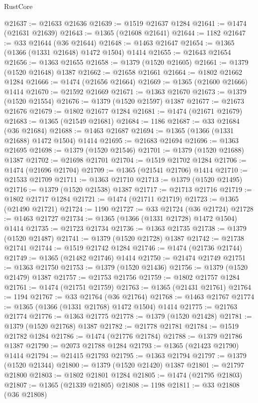 \begin{lexlean}{RustCore}
\begin{coremodule}
@21637 := @21633 @21636
@21639 := @1519 @21637 @1284
@21641 := @1474 (@21631 @21639)
@21643 := @1365 (@21608 @21641)
@21644 := 1182
@21647 := @33 @21644 (@36 @21644)
@21648 := @1463 @21647
@21654 := @1365 (@1366 (@1331 @21648) @1472 @1504) @1414
@21655 := @21643 @21654
@21656 := @1363 @21655
@21658 := @1379 (@1520 @21605)
@21661 := @1379 (@1520 @21648) @1387
@21662 := @21658 @21661
@21664 := @1802 @21662 @1284
@21666 := @1474 (@21656 @21664)
@21669 := @1365 (@21600 @21666) @1414
@21670 := @21592 @21669
@21671 := @1363 @21670
@21673 := @1379 (@1520 @21554)
@21676 := @1379 (@1520 @21597) @1387
@21677 := @21673 @21676
@21679 := @1802 @21677 @1284
@21681 := @1474 (@21671 @21679)
@21683 := @1365 (@21549 @21681)
@21684 := 1186
@21687 := @33 @21684 (@36 @21684)
@21688 := @1463 @21687
@21694 := @1365 (@1366 (@1331 @21688) @1472 @1504) @1414
@21695 := @21683 @21694
@21696 := @1363 @21695
@21698 := @1379 (@1520 @21546)
@21701 := @1379 (@1520 @21688) @1387
@21702 := @21698 @21701
@21704 := @1519 @21702 @1284
@21706 := @1474 (@21696 @21704)
@21709 := @1365 (@21541 @21706) @1414
@21710 := @21533 @21709
@21711 := @1363 @21710
@21713 := @1379 (@1520 @21495)
@21716 := @1379 (@1520 @21538) @1387
@21717 := @21713 @21716
@21719 := @1802 @21717 @1284
@21721 := @1474 (@21711 @21719)
@21723 := @1365 (@21490 @21721)
@21724 := 1190
@21727 := @33 @21724 (@36 @21724)
@21728 := @1463 @21727
@21734 := @1365 (@1366 (@1331 @21728) @1472 @1504) @1414
@21735 := @21723 @21734
@21736 := @1363 @21735
@21738 := @1379 (@1520 @21487)
@21741 := @1379 (@1520 @21728) @1387
@21742 := @21738 @21741
@21744 := @1519 @21742 @1284
@21746 := @1474 (@21736 @21744)
@21749 := @1365 (@21482 @21746) @1414
@21750 := @21474 @21749
@21751 := @1363 @21750
@21753 := @1379 (@1520 @21436)
@21756 := @1379 (@1520 @21479) @1387
@21757 := @21753 @21756
@21759 := @1802 @21757 @1284
@21761 := @1474 (@21751 @21759)
@21763 := @1365 (@21431 @21761)
@21764 := 1194
@21767 := @33 @21764 (@36 @21764)
@21768 := @1463 @21767
@21774 := @1365 (@1366 (@1331 @21768) @1472 @1504) @1414
@21775 := @21763 @21774
@21776 := @1363 @21775
@21778 := @1379 (@1520 @21428)
@21781 := @1379 (@1520 @21768) @1387
@21782 := @21778 @21781
@21784 := @1519 @21782 @1284
@21786 := @1474 (@21776 @21784)
@21788 := @1379 @21786 @1387
@21790 := @2073 @21788 @1284
@21793 := @1365 (@21423 @21790) @1414
@21794 := @21415 @21793
@21795 := @1363 @21794
@21797 := @1379 (@1520 @21344)
@21800 := @1379 (@1520 @21420) @1387
@21801 := @21797 @21800
@21803 := @1802 @21801 @1284
@21805 := @1474 (@21795 @21803)
@21807 := @1365 (@21339 @21805)
@21808 := 1198
@21811 := @33 @21808 (@36 @21808)

\end{coremodule}
\end{lexlean}
